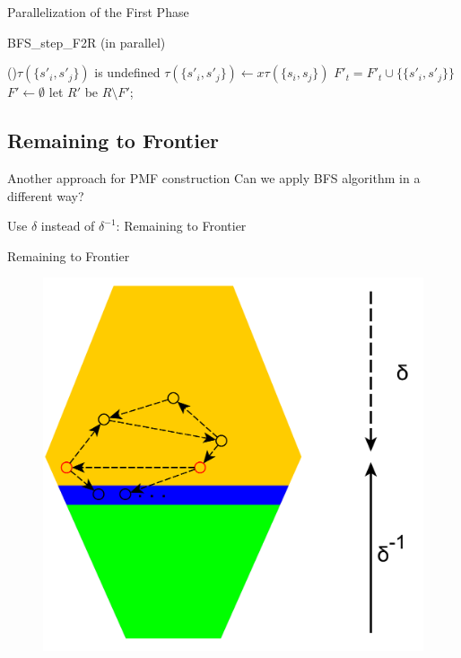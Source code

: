 \documentclass{beamer}
\begin{document}
\begin{frame}{Parallelization of the First Phase}
\small
\begin{algorithm}[H]
	\caption{BFS\_step\_F2R (in parallel)}
	\label{algo:BFS-step-F2R-Parallel}
	
	
	{
		{
			{
				\If(){$\tau({\{ s'_i,s'_j \}})$ is undefined}
				{
					$\tau(\{ s'_i,s'_j\}) \longleftarrow x \tau(\{ s_i,s_j \})$\;
					$F'_t = F'_t \cup \{ \{ s'_i,s'_j \}  \} $\;
				}
			}
		}
	}
	$F' \longleftarrow \emptyset$\;
	let $R'$ be $R \setminus F'$;
\end{algorithm}
\end{frame}

\subsection{Remaining to Frontier}

\begin{frame}{Another approach for PMF construction}
Can we apply BFS algorithm in a different way?

Use $\delta$ instead of $\delta^{-1}$: \alert{Remaining to Frontier}
\end{frame}


\begin{frame}{Remaining to Frontier}
	\begin{figure}
		\includegraphics[height=\textheight]{figs/r2f.pdf}
	\end{figure}
\end{frame}
\end{document}

